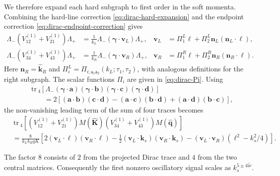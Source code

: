 \documentclass[a4paper,12pt]{article}
\def\mb{\mathbf}
\def\tr{\mathrm{\,tr\,}}
\def\ii{\mathrm{i}}
\def\tn{\tilde\nu}
\def\aa{\mathsf{a}}
\begin{document}
We therefore expand each hard subgraph to first order in the soft momenta.
Combining the hard-line correction \eqref{eq:dirac-hard-expansion} and the endpoint correction \eqref{eq:dirac-endpoint-correction} gives
\begin{align}
 \Lambda_-(V_{12}^{(1)}+V_{21}^{(1)})\Lambda_+
 &=\frac1{k_L}\Lambda_-
       (\bm\gamma\cdot\mb v_L)\Lambda_+,
 &\mb v_L&=\Pi^L_1\bm\ell
       +\Pi^L_2\mb n_L(\mb n_L\cdot\bm\ell),\nonumber\\
 \Lambda_-(V_{34}^{(1)}+V_{43}^{(1)})\Lambda_+
 &=\frac1{k_R}\Lambda_-
       (\bm\gamma\cdot\mb v_R)\Lambda_+,
 &\mb v_R&=\Pi^R_1\bm\ell
       +\Pi^R_2\mb n_R(\mb n_R\cdot\bm\ell).
 \label{eq:dirac-first-order}
\end{align}
Here $\mb n_R=\widehat{\mb k}_R$ and $\Pi_i^L=\Pi_{i;\aa_1\aa_2}(k_L;\tau_1,\tau_2)$, with analogous definitions for the right subgraph.
The scalar functions $\Pi_i$ are given in \eqref{eq:dirac-Pi}.
Using
\begin{align}
 &\tr_4[\Lambda_-(\bm\gamma\cdot\mb a)
 (\bm\gamma\cdot\mb b)(\bm\gamma\cdot\mb c)
 (\bm\gamma\cdot\mb d)]\nonumber\\
 &\qquad=2[(\mb a\cdot\mb b)(\mb c\cdot\mb d)
 -(\mb a\cdot\mb c)(\mb b\cdot\mb d)
 +(\mb a\cdot\mb d)(\mb b\cdot\mb c)],
 \label{eq:dirac-four-gamma-trace}
\end{align}
the non-vanishing leading term of the sum of four traces becomes
\begin{align}
 &\tr_4[(V_{12}^{(1)}+V_{21}^{(1)})M(\widehat{\mb K})
        (V_{34}^{(1)}+V_{43}^{(1)})M(\widehat{\mb q})]
 \nonumber\\
 &=\frac{8}{k_Lk_RqK}\left[
 2(\mb v_L\cdot\bm\ell)(\mb v_R\cdot\bm\ell)
 -\frac12(\mb v_L\cdot\mb k_s)(\mb v_R\cdot\mb k_s)
 -(\mb v_L\cdot\mb v_R)(\ell^2-k_s^2/4)\right].
 \label{eq:dirac-scalar-trace}
\end{align}

The factor $8$ consists of $2$ from the projected Dirac trace and $4$ from the two central matrices.
Consequently the first nonzero oscillatory signal scales as $k_s^{5\pm4\ii\tn}$.
\end{document}
